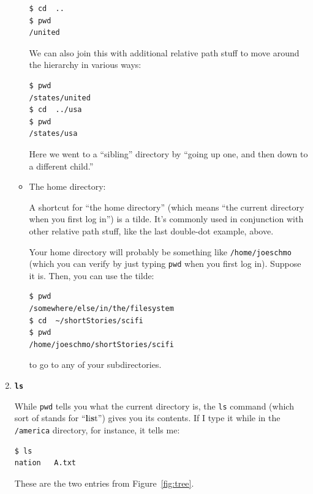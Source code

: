 \begin{enumerate}
\begin{itemize}
\begin{Verbatim}[fontsize=\small]
$ cd  ..
$ pwd
/united
\end{Verbatim}

We can also join this with additional relative path stuff to move around the
hierarchy in various ways:

\begin{Verbatim}[fontsize=\small]
$ pwd
/states/united
$ cd  ../usa
$ pwd
/states/usa
\end{Verbatim}

Here we went to a ``sibling'' directory by ``going up one, and then down to a
different child.''

\item The home directory: \texttt{\textbf{\freakingtilde}}

A shortcut for ``the home directory'' (which means ``the current directory when
you first log in'') is a tilde. It's commonly used in conjunction with other
relative path stuff, like the last double-dot example, above.

Your home directory will probably be something like \texttt{/home/joeschmo}
(which you can verify by just typing \texttt{pwd} when you first log in).
Suppose it is. Then, you can use the tilde:

\begin{Verbatim}[fontsize=\small]
$ pwd
/somewhere/else/in/the/filesystem
$ cd  ~/shortStories/scifi
$ pwd
/home/joeschmo/shortStories/scifi
\end{Verbatim}

to go to any of your subdirectories.

\end{itemize}

\bigline
\item \textbf{\texttt{ls}}

While \texttt{pwd} tells you what the current directory is, the \texttt{ls}
command (which sort of stands for ``\textbf{l}i\textbf{s}t'') gives you its
contents. If I type it while in the \texttt{/america} directory, for instance,
it tells me:

\begin{Verbatim}[fontsize=\small]
$ ls
nation   A.txt
\end{Verbatim}

These are the two entries from Figure~\ref{fig:tree}.


\end{enumerate}
